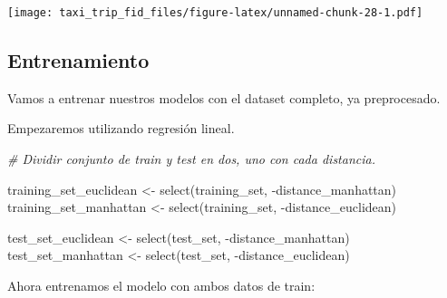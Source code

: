 \documentclass[
]{article}
\newenvironment{Shaded}{\begin{snugshade}}{\end{snugshade}}
\newcommand{\AttributeTok}[1]{\textcolor[rgb]{0.77,0.63,0.00}{#1}}
\newcommand{\CommentTok}[1]{\textcolor[rgb]{0.56,0.35,0.01}{\textit{#1}}}
\newcommand{\FunctionTok}[1]{\textcolor[rgb]{0.00,0.00,0.00}{#1}}
\newcommand{\NormalTok}[1]{#1}
\newcommand{\OtherTok}[1]{\textcolor[rgb]{0.56,0.35,0.01}{#1}}
\newcommand{\SpecialCharTok}[1]{\textcolor[rgb]{0.00,0.00,0.00}{#1}}
\newcommand{\StringTok}[1]{\textcolor[rgb]{0.31,0.60,0.02}{#1}}
\begin{document}
\texttt{[image: taxi\_trip\_fid\_files/figure-latex/unnamed-chunk-28-1.pdf]}

\hypertarget{entrenamiento}{%
\subsection{Entrenamiento}\label{entrenamiento}}

Vamos a entrenar nuestros modelos con el dataset completo, ya
preprocesado.

Empezaremos utilizando regresión lineal.

\begin{Shaded}
\begin{Highlighting}[]
\CommentTok{\# Dividir conjunto de train y test en dos, uno con cada distancia.}

\NormalTok{training\_set\_euclidean }\OtherTok{\textless{}{-}} \FunctionTok{select}\NormalTok{(training\_set, }\SpecialCharTok{{-}}\NormalTok{distance\_manhattan)}
\NormalTok{training\_set\_manhattan }\OtherTok{\textless{}{-}} \FunctionTok{select}\NormalTok{(training\_set, }\SpecialCharTok{{-}}\NormalTok{distance\_euclidean)}

\NormalTok{test\_set\_euclidean }\OtherTok{\textless{}{-}} \FunctionTok{select}\NormalTok{(test\_set, }\SpecialCharTok{{-}}\NormalTok{distance\_manhattan)}
\NormalTok{test\_set\_manhattan }\OtherTok{\textless{}{-}} \FunctionTok{select}\NormalTok{(test\_set, }\SpecialCharTok{{-}}\NormalTok{distance\_euclidean)}
\end{Highlighting}
\end{Shaded}

Ahora entrenamos el modelo con ambos datos de train:

\begin{Shaded}
\end{Shaded}
\end{document}
